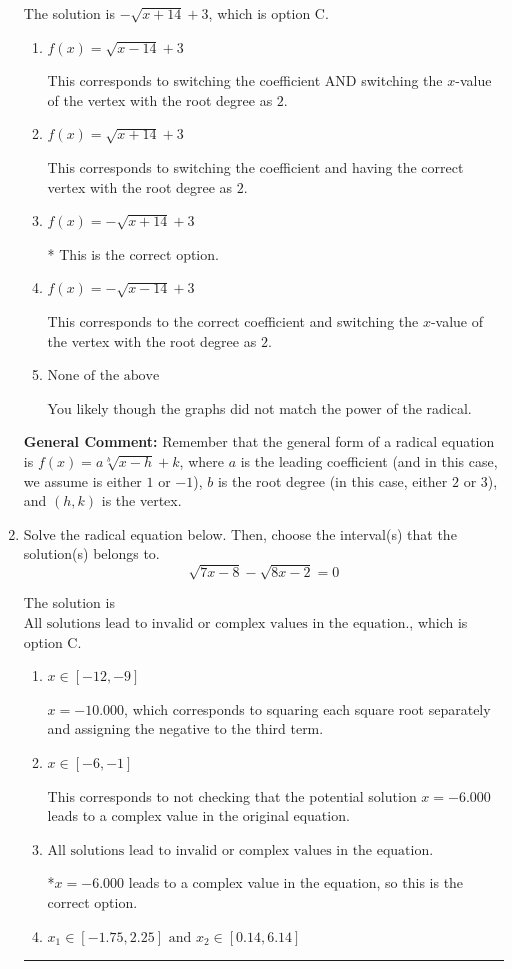 \documentclass{extbook}[14pt]
\newcommand{\litem}[1]{\item #1

\rule{\textwidth}{0.4pt}}
\begin{document}
\begin{enumerate}
{The solution is \( - \sqrt{x + 14} + 3 \), which is option C.\begin{enumerate}[label=\Alph*.]
\item \( f(x) = \sqrt{x - 14} + 3 \)

This corresponds to switching the coefficient AND switching the $x$-value of the vertex with the root degree as $2$.
\item \( f(x) = \sqrt{x + 14} + 3 \)

This corresponds to switching the coefficient and having the correct vertex with the root degree as $2$.
\item \( f(x) = - \sqrt{x + 14} + 3 \)

* This is the correct option.
\item \( f(x) = - \sqrt{x - 14} + 3 \)

This corresponds to the correct coefficient and switching the $x$-value of the vertex with the root degree as $2$.
\item \( \text{None of the above} \)

You likely though the graphs did not match the power of the radical.
\end{enumerate}

\textbf{General Comment:} Remember that the general form of a radical equation is $ f(x) = a \sqrt[b]{x - h} + k$, where $a$ is the leading coefficient (and in this case, we assume is either $1$ or $-1$), $b$ is the root degree (in this case, either $2$ or $3$), and $(h, k)$ is the vertex.
}
\litem{
Solve the radical equation below. Then, choose the interval(s) that the solution(s) belongs to.
\[ \sqrt{7 x - 8} - \sqrt{8 x - 2} = 0 \]

The solution is \( \text{All solutions lead to invalid or complex values in the equation.} \), which is option C.\begin{enumerate}[label=\Alph*.]
\item \( x \in [-12,-9] \)

$x = -10.000$, which corresponds to squaring each square root separately and assigning the negative to the third term.
\item \( x \in [-6,-1] \)

This corresponds to not checking that the potential solution $x = -6.000$ leads to a complex value in the original equation.
\item \( \text{All solutions lead to invalid or complex values in the equation.} \)

*$x = -6.000$ leads to a complex value in the equation, so this is the correct option.
\item \( x_1 \in [-1.75, 2.25] \text{ and } x_2 \in [0.14,6.14] \)


\end{enumerate}}
\end{enumerate}
\end{document}
